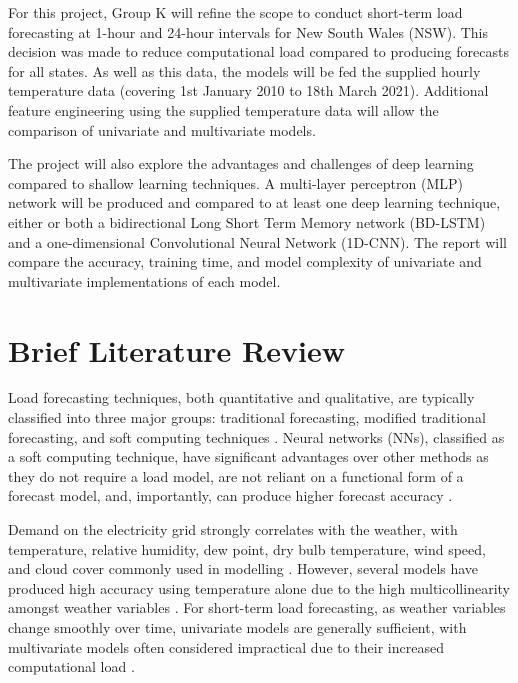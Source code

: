 \documentclass[mstat,12pt]{unswthesis}
\begin{document}
For this project, Group K will refine the scope to conduct short-term load forecasting at 1-hour and 24-hour intervals for New South Wales (NSW). This decision was made to reduce computational load compared to producing forecasts for all states. As well as this data, the models will be fed the supplied hourly temperature data (covering 1st January 2010 to 18th March 2021). Additional feature engineering using the supplied temperature data will allow the comparison of univariate and multivariate models.\newline

The project will also explore the advantages and challenges of deep learning compared to shallow learning techniques. A multi-layer perceptron (MLP) network will be produced and compared to at least one deep learning technique, either or both a bidirectional Long Short Term Memory network (BD-LSTM) and a one-dimensional Convolutional Neural Network (1D-CNN). The report will compare the accuracy, training time, and model complexity of univariate and multivariate implementations of each model.\newline

\hypertarget{brief-literature-review}{
    \section{Brief Literature Review}\label{brief-literature-review}
}

Load forecasting techniques, both quantitative and qualitative, are typically classified into three major groups: traditional forecasting, modified traditional forecasting, and soft computing techniques \cite{Singh2013}. Neural networks (NNs), classified as a soft computing technique, have significant advantages over other methods as they do not require a load model, are not reliant on a functional form of a forecast model, and, importantly, can produce higher forecast accuracy \cite{Djukanovic1995}.\newline 

Demand on the electricity grid strongly correlates with the weather, with temperature, relative humidity, dew point, dry bulb temperature, wind speed, and cloud cover commonly used in modelling \cite{Raza2015}. However, several models have produced high accuracy using temperature alone due to the high multicollinearity amongst weather variables \cite{Chandra2021}. For short-term load forecasting, as weather variables change smoothly over time, univariate models are generally sufficient, with multivariate models often considered impractical due to their increased computational load \cite{ElHawary2017}. \newline
\end{document}
